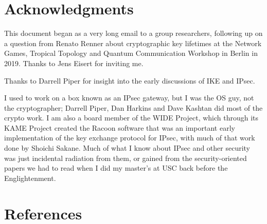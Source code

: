 \documentclass[%
 aip,
 jmp,%
 amsmath,amssymb,
 reprint,%
]{revtex4-1}
\begin{document}








\section*{Acknowledgments}

This document began as a very long email to a group researchers,
following up on a question from Renato Renner about cryptographic key
lifetimes at the Network Games, Tropical Topology and Quantum
Communication Workshop in Berlin in 2019.  Thanks to Jens Eisert for
inviting me.

Thanks to Darrell Piper for insight into the early discussions of IKE
and IPsec.

I used to work on a box known as an IPsec gateway, but I was the OS
guy, not the cryptographer; Darrell Piper, Dan Harkins and Dave
Kashtan did most of the crypto work.  I am also a board member of the
WIDE Project, which through its KAME Project created the Racoon
software that was an important early implementation of the key
exchange protocol for IPsec, with much of that work done by Shoichi
Sakane.  Much of what I know about IPsec and other security was just
incidental radiation from them, or gained from the security-oriented
papers we had to read when I did my master's at USC back before the
Englightenment.

\section{References}





\appendix
\onecolumngrid





\end{document}
